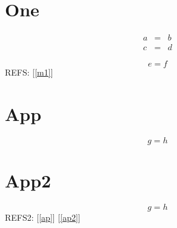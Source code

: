 
\section{One}
\begin{mathletters}
\begin{eqnarray}
a&=&b\label{m1}\\
c&=&d
\end{eqnarray}
\end{mathletters}
\begin{equation}e=f\end{equation}
REFS: [\ref{m1}]
\appendix
\section*{App}
\begin{equation}g=h\label{ap}\end{equation}
\section{App2}
\begin{equation}g=h\label{ap2}\end{equation}
REFS2: [\ref{ap}] [\ref{ap2}]

